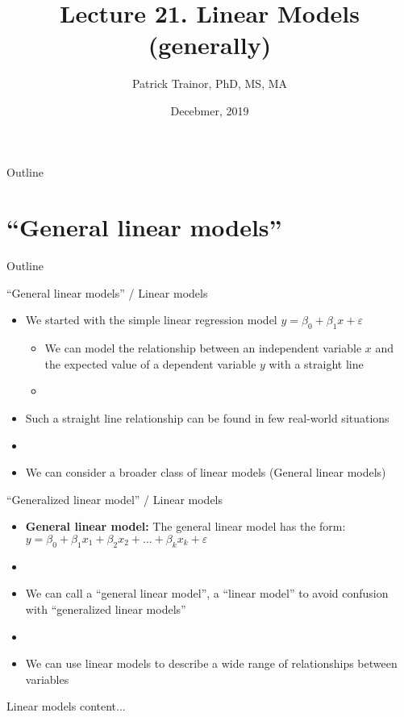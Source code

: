 \documentclass[xcolor=dvipsnames]{beamer}
\title[Lecture 21]{Lecture 21. Linear Models (generally)}
\author[Patrick Trainor]{Patrick Trainor, PhD, MS, MA}
\institute[NMSU]{New Mexico State University}
\date{Decebmer, 2019}
\begin{document}
\begin{frame}
\maketitle
\end{frame}

\begin{frame}{Outline}
\tableofcontents[hideallsubsections]
\end{frame}

\section{``General linear models''}
\begin{frame}{Outline}
	\tableofcontents[currentsection,subsectionstyle=show/shaded/hide]
\end{frame}

\begin{frame}{``General linear models'' / Linear models}
	\begin{itemize}
		\item We started with the simple linear regression model $y = \beta_0 + \beta_1 x + \varepsilon$
		\begin{itemize}
			\item We can model the relationship between an independent variable $x$ and the expected value of a dependent variable $y$ with a straight line
			\item[]
		\end{itemize}
		\item Such a straight line relationship can be found in few real-world situations
		\item[]
		\item We can consider a broader class of linear models (General linear models)
	\end{itemize}
\end{frame}

\begin{frame}{``Generalized linear model'' / Linear models}
	\begin{itemize}
		\item \textbf{General linear model:} The general linear model has the form: $y = \beta_0 + \beta_1 x_1 + \beta_2 x_2 + \hdots + \beta_k x_k + \varepsilon$
		\item[]
		\item We can call a ``general linear model'', a ``linear model'' to avoid confusion with ``generalized linear models''
		\item[]
		\item We can use linear models to describe a wide range of relationships between variables
	\end{itemize}
\end{frame}

\begin{frame}{Linear models}
	content...
\end{frame}
\end{document}
